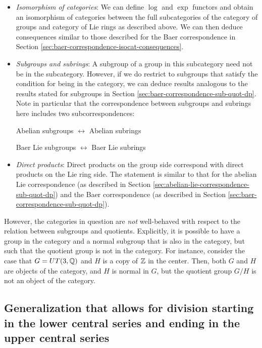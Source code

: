\begin{itemize}
\item {\em Isomorphism of categories}: We can define $\log$ and $\exp$
  functors and obtain an isomorphism of categories between the full
  subcategories of the category of groups and category of Lie rings as
  described above. We can then deduce consequences similar to those
  described for the Baer correspondence in Section
  \ref{sec:baer-correspondence-isocat-consequences}.
\item {\em Subgroups and subrings}: A subgroup of a group in this
  subcategory need not be in the subcategory. However, if we do
  restrict to subgroups that satisfy the condition for being in the
  category, we can deduce results analogous to the results stated for
  subgroups in Section \ref{sec:baer-correspondence-sub-quot-dp}. Note
  in particular that the correspondence between subgroups and subrings
  here includes two subcorrespondences:

  \begin{center}
    Abelian subgroups $\leftrightarrow$ Abelian subrings
  \end{center}

  \begin{center}
    Baer Lie subgroups $\leftrightarrow$ Baer Lie subrings
  \end{center}
\item {\em Direct products}: Direct products on the group side
  correspond with direct products on the Lie ring side. The statement
  is similar to that for the abelian Lie correspondence (as described
  in Section \ref{sec:abelian-lie-correspondence-sub-quot-dp}) and the
  Baer correspondence (as described in Section
  \ref{sec:baer-correspondence-sub-quot-dp}).
\end{itemize}

However, the categories in question are {\em not} well-behaved with
respect to the relation between subgroups and quotients. Explicitly,
it is possible to have a group in the category and a normal subgroup
that is also in the category, but such that the quotient group is not
in the category. For instance, consider the case that $G = UT(3,\mathbb{Q})$
and $H$ is a copy of $\mathbb{Z}$ in the center. Then, both $G$ and $H$ are
objects of the category, and $H$ is normal in $G$, but the quotient
group $G/H$ is not an object of the category.

\subsection{Generalization that allows for division starting in the lower central series and ending in the upper central series}\label{sec:baer-correspondence-lucs-generalization}

